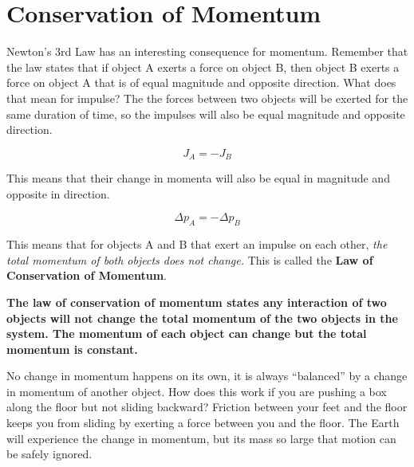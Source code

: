 \documentclass[12pt]{book}
\begin{document}
\section{Conservation of Momentum}

Newton's 3rd Law has an interesting consequence for momentum. Remember that the law states that if object A exerts a force on object B, then object B exerts a force on object A that is of equal magnitude and opposite direction. What does that mean for impulse? The the forces between two objects will be exerted for the same duration of time, so the impulses will also be equal magnitude and opposite direction. 

\begin{equation}
J_A = -J_B
\end{equation}

This means that their change in momenta will also be equal in magnitude and opposite in direction.

\begin{equation}
\Delta p_A = -\Delta p_B
\end{equation}

This means that for objects A and B that exert an impulse on each other, \textit{the total momentum of both objects does not change.} This is called the \textbf{Law of Conservation of Momentum}.

\linespace

\textbf{The law of conservation of momentum states any interaction of two objects will not change the total momentum of the two objects in the system. The momentum of each object can change but the total momentum is constant.}

\linespace

No change in momentum happens on its own, it is always ``balanced'' by a change in momentum of another object. How does this work if you are pushing a box along the floor but not sliding backward? Friction between your feet and the floor keeps you from sliding by exerting a force between you and the floor. The Earth will experience the change in momentum, but its mass so large that motion can be safely ignored.
\end{document}
